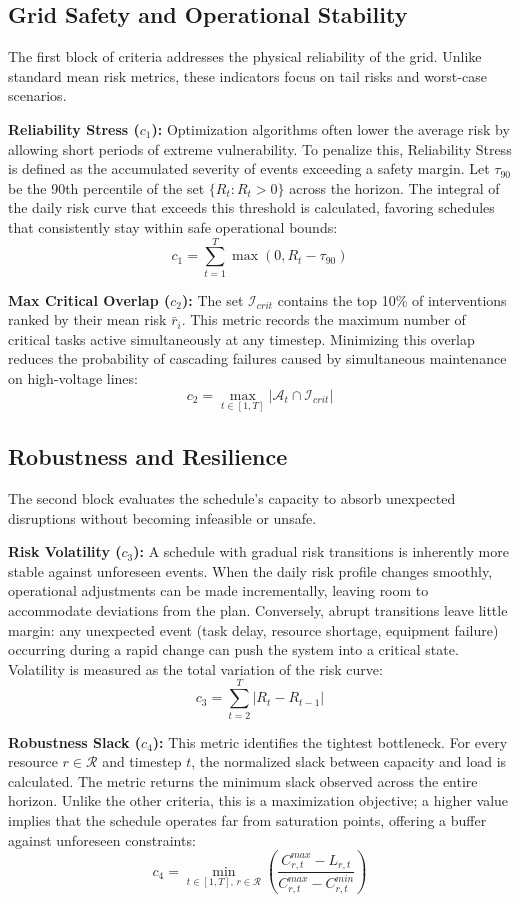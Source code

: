 \subsection{Grid Safety and Operational Stability}

The first block of criteria addresses the physical reliability of the grid. Unlike standard mean risk metrics, these indicators focus on tail risks and worst-case scenarios.

\textbf{Reliability Stress ($c_1$):} Optimization algorithms often lower the average risk by allowing short periods of extreme vulnerability. To penalize this, Reliability Stress is defined as the accumulated severity of events exceeding a safety margin. Let $\tau_{90}$ be the 90th percentile of the set $\{R_t : R_t > 0\}$ across the horizon. The integral of the daily risk curve that exceeds this threshold is calculated, favoring schedules that consistently stay within safe operational bounds:
\[
c_1 = \sum_{t=1}^{T} \max(0, R_t - \tau_{90})
\]

\textbf{Max Critical Overlap ($c_2$):} The set $\mathcal{I}_{crit}$ contains the top 10\% of interventions ranked by their mean risk $\bar{r}_i$. This metric records the maximum number of critical tasks active simultaneously at any timestep. Minimizing this overlap reduces the probability of cascading failures caused by simultaneous maintenance on high-voltage lines:
\[
c_2 = \max_{t \in [1, T]} \left| \mathcal{A}_t \cap \mathcal{I}_{crit} \right|
\]

\subsection{Robustness and Resilience}

The second block evaluates the schedule's capacity to absorb unexpected disruptions without becoming infeasible or unsafe.

\textbf{Risk Volatility ($c_3$):} A schedule with gradual risk transitions is inherently more stable against unforeseen events. When the daily risk profile changes smoothly, operational adjustments can be made incrementally, leaving room to accommodate deviations from the plan. Conversely, abrupt transitions leave little margin: any unexpected event (task delay, resource shortage, equipment failure) occurring during a rapid change can push the system into a critical state. Volatility is measured as the total variation of the risk curve:
\[
c_3 = \sum_{t=2}^{T} | R_t - R_{t-1} |
\]

\textbf{Robustness Slack ($c_4$):} This metric identifies the tightest bottleneck. For every resource $r \in \mathcal{R}$ and timestep $t$, the normalized slack between capacity and load is calculated. The metric returns the minimum slack observed across the entire horizon. Unlike the other criteria, this is a maximization objective; a higher value implies that the schedule operates far from saturation points, offering a buffer against unforeseen constraints:
\[
c_4 = \min_{t \in [1,T],\, r \in \mathcal{R}} \left( \frac{C_{r,t}^{max} - L_{r,t}}{C_{r,t}^{max} - C_{r,t}^{min}} \right)
\]

